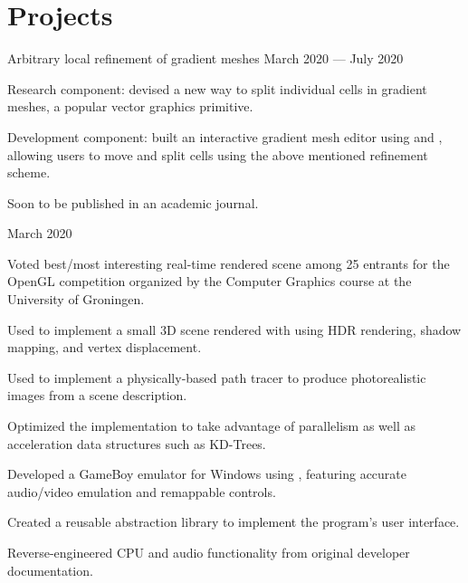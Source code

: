 \section*{Projects}
\begin{cventries}
  {Arbitrary local refinement of gradient meshes}
  {March 2020 --- July 2020}
  {}
  {%
    \begin{cvitems}
      \item Research component: devised a new way to split individual cells in gradient meshes, a popular vector graphics primitive.
      \item Development component: built an interactive gradient mesh editor using  and , allowing users to move and split cells using the above mentioned refinement scheme.
      \item Soon to be published in an academic journal.
    \end{cvitems}
  }
  {}
  {March 2020}
  {}
  {%
    \begin{cvitems}
      \item Voted best/most interesting real-time rendered scene among 25 entrants for the OpenGL competition organized by the Computer Graphics course at the University of Groningen.
      \item Used  to implement a small 3D scene rendered with  using HDR rendering, shadow mapping, and vertex displacement.
    \end{cvitems}
  }
  {}
  {}
  {}
  {%
    \begin{cvitems}
    \item Used  to implement a physically-based path tracer to produce photorealistic images from a scene description.
      \item Optimized the implementation to take advantage of parallelism as well as acceleration data structures such as KD-Trees.
    \end{cvitems}
  }
  {}
  {}
  {}
  {%
    \begin{cvitems}
    \item Developed a GameBoy emulator for Windows using , featuring accurate audio/video emulation and remappable controls.
    \item Created a reusable  abstraction library to implement the program's user interface.
    \item Reverse-engineered CPU and audio functionality from original developer documentation.
    \end{cvitems}
  }
\end{cventries}
